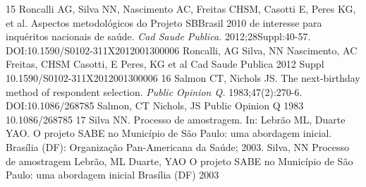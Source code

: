 \documentclass{article}
\begin{document}
15%
Roncalli AG, Silva NN, Nascimento AC, Freitas CHSM, Casotti E, Peres KG, et al. Aspectos metodológicos do Projeto SBBrasil 2010 de interesse para inquéritos nacionais de saúde. %
\textit{Cad Saude Publica.}
 2012;28Suppl:40-57. DOI:10.1590/S0102-311X2012001300006%
Roncalli, %
AG
Silva, %
NN
Nascimento, %
AC
Freitas, %
CHSM
Casotti, %
E
Peres, %
KG
et al%
Cad Saude Publica%
2012%
Suppl%
10.1590/S0102-311X2012001300006%
16%
Salmon CT, Nichols JS. The next-birthday method of respondent selection. %
\textit{Public Opinion Q.}
 1983;47(2):270-6. DOI:10.1086/268785%
Salmon, %
CT
Nichols, %
JS
Public Opinion Q%
1983%
10.1086/268785%
17%
Silva NN. Processo de amostragem. In: Lebrão ML, Duarte YAO. O projeto SABE no Município de São Paulo: uma abordagem inicial. Brasília (DF): Organização Pan-Americana da Saúde; 2003.%
Silva, %
NN
Processo de amostragem%
Lebrão, %
ML
Duarte, %
YAO
O projeto SABE no Município de São Paulo: uma abordagem inicial%
Brasília (DF)%
2003%
\end{document}
